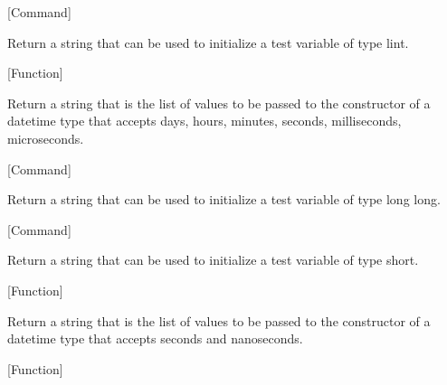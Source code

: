 \vspace{1em}
\noindent
{}
\usebox{\funcname}
 \hfill [Command]

\begin{doc-string}
Return a string that can be used to initialize a test variable of type lint.
\end{doc-string}

\vspace{1em}
\noindent
{}
\usebox{\funcname}
 \hfill [Function]

\begin{doc-string}
Return a string that is the list of values to be passed to the constructor of a datetime
 type that accepts days, hours, minutes, seconds, milliseconds, microseconds.
\end{doc-string}

\vspace{1em}
\noindent
{}
\usebox{\funcname}
 \hfill [Command]

\begin{doc-string}
Return a string that can be used to initialize a test variable of type long long.
\end{doc-string}

\vspace{1em}
\noindent
{}
\usebox{\funcname}
 \hfill [Command]

\begin{doc-string}
Return a string that can be used to initialize a test variable of type short.
\end{doc-string}

\vspace{1em}
\noindent
{}
\usebox{\funcname}
 \hfill [Function]

\begin{doc-string}
Return a string that is the list of values to be passed to the constructor of a datetime
 type that accepts seconds and nanoseconds.
\end{doc-string}

\vspace{1em}
\noindent
{}
\usebox{\funcname}
 \hfill [Function]

